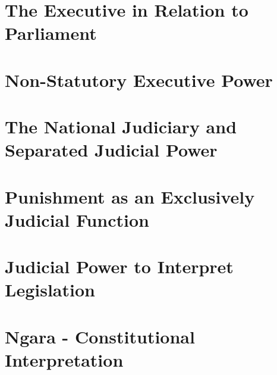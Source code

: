 \documentclass[12pt]{book}
\begin{document}
\chapter{The Executive in Relation to Parliament}


\chapter{Non-Statutory Executive Power}


\chapter{The National Judiciary and Separated Judicial Power}


\chapter{Punishment as an Exclusively Judicial Function}


\chapter{Judicial Power to Interpret Legislation}


\chapter{Ngara - Constitutional Interpretation}


% 

% 


\end{document}
